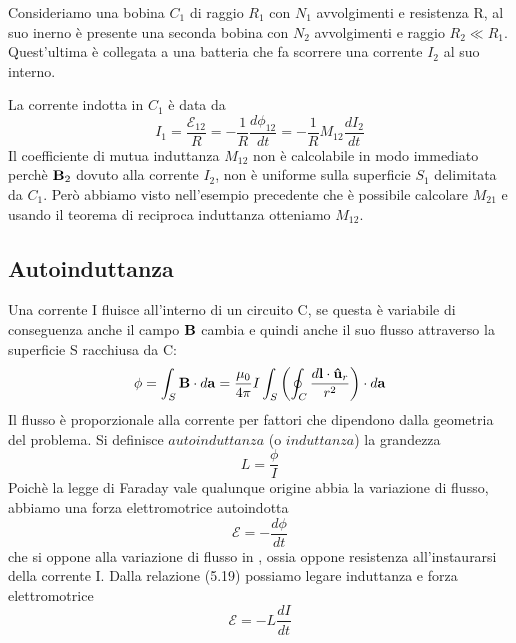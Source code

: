 
Consideriamo una bobina $C_1$ di raggio $R_1$ con $N_1$ avvolgimenti e resistenza R, al suo inerno \`e presente una seconda bobina con $N_2$ avvolgimenti e raggio $R_2 \ll R_1$. Quest'ultima \`e collegata a una batteria che fa scorrere una corrente $I_2$ al suo interno.
\newline

La corrente indotta in $C_1$ \`e data da 
\begin{equation*}
	I_1 = \frac{\mathcal{E}_{12}}{R} = - \frac{1}{R} \frac{d\phi_{12}}{dt} = -\frac{1}{R}M_{12} \frac{dI_2}{dt}
\end{equation*}
Il coefficiente di mutua induttanza $M_{12}$ non \`e calcolabile in modo immediato perch\`e $\bold{B}_2$ dovuto alla corrente $I_2$, non \`e uniforme sulla superficie $S_1$ delimitata da $C_1$. Per\`o abbiamo visto nell'esempio precedente che \`e possibile calcolare $M_{21}$ e usando il teorema di reciproca induttanza otteniamo $M_{12}$.

\subsection{Autoinduttanza}


Una corrente I fluisce all'interno di un circuito C, se questa \`e variabile di conseguenza anche il campo $\bold{B}$ cambia e quindi anche il suo flusso attraverso la superficie S racchiusa da C:
\begin{equation*}
	\phi = \int_{S} \bold{B} \cdot d \bold{a} = \frac{\mu_0}{4 \pi}I \int_{S}\left(\oint_{C} \frac{d \bold{l} \cdot \bold{\hat{u}}_{r}}{r^2}\right) \cdot d \bold{a}
\end{equation*}
Il flusso \`e proporzionale alla corrente per fattori che dipendono dalla geometria del problema.  Si definisce $autoinduttanza$ (o $induttanza$) la grandezza 
\begin{equation}
	L = \frac{\phi}{I}
\end{equation} 
Poich\`e la legge di Faraday vale qualunque origine abbia la variazione di flusso, abbiamo una forza elettromotrice autoindotta
\begin{equation*}
	\mathcal{E} = - \frac{d\phi}{dt}
\end{equation*}
che si oppone alla variazione di flusso in , ossia oppone resistenza all'instaurarsi della corrente I. Dalla relazione (5.19) possiamo legare induttanza e forza elettromotrice 
\begin{equation}
	\mathcal{E} = - L \frac{dI}{dt}
\end{equation}

